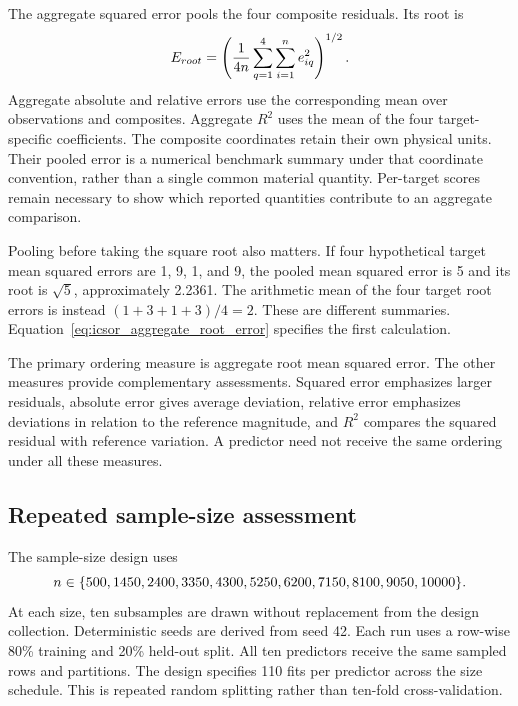 The aggregate squared error pools the four composite residuals. Its root is
\begin{equation}
\equationname{Root mean squared error pooled across four reported composites}
\label{eq:icsor_aggregate_root_error}
E_{root}=\left(\frac{1}{4n}\sum_{q=1}^{4}\sum_{i=1}^{n}e_{iq}^{2}\right)^{1/2}.
\end{equation}
Aggregate absolute and relative errors use the corresponding mean over observations and composites. Aggregate \(R^2\) uses the mean of the four target-specific coefficients. The composite coordinates retain their own physical units. Their pooled error is a numerical benchmark summary under that coordinate convention, rather than a single common material quantity. Per-target scores remain necessary to show which reported quantities contribute to an aggregate comparison.

Pooling before taking the square root also matters. If four hypothetical target mean squared errors are 1, 9, 1, and 9, the pooled mean squared error is 5 and its root is \(\sqrt5\), approximately 2.2361. The arithmetic mean of the four target root errors is instead \((1+3+1+3)/4=2\). These are different summaries. Equation~\eqref{eq:icsor_aggregate_root_error} specifies the first calculation.

The primary ordering measure is aggregate root mean squared error. The other measures provide complementary assessments. Squared error emphasizes larger residuals, absolute error gives average deviation, relative error emphasizes deviations in relation to the reference magnitude, and \(R^2\) compares the squared residual with reference variation. A predictor need not receive the same ordering under all these measures.

\subsection{Repeated sample-size assessment}

The sample-size design uses
\begin{equation}
\equationname{Observation counts for structured-regression sample-size assessment}
\label{eq:icsor_assessment_sizes}
n\in\{500,1450,2400,3350,4300,5250,6200,7150,8100,9050,10000\}.
\end{equation}
At each size, ten subsamples are drawn without replacement from the design collection. Deterministic seeds are derived from seed 42. Each run uses a row-wise 80\% training and 20\% held-out split. All ten predictors receive the same sampled rows and partitions. The design specifies 110 fits per predictor across the size schedule. This is repeated random splitting rather than ten-fold cross-validation.

